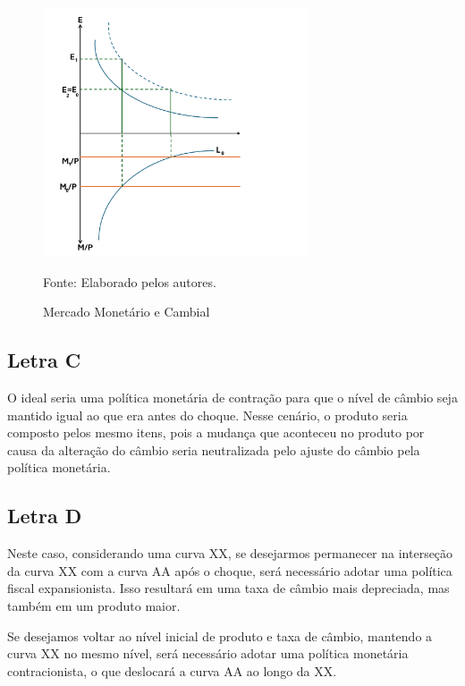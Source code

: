 \documentclass[a4paper,12pt]{article}[abntex2]
\begin{document}
\begin{figure}[H]
    \centering
    \caption{Mercado Monetário e Cambial} 
    \includegraphics[width=0.7\textwidth]{4º Período/Macroeconomia Internacional/APS 4 Macro Int/Merc. Mont L(c).png}
    \label{fig:Moeda L}
    
    \footnotesize{Fonte: Elaborado pelos autores.}
    \end{figure}

\subsection{\textbf{Letra C}}
O ideal seria uma política monetária de contração para que o nível de câmbio seja mantido igual ao que era antes do choque. Nesse cenário, o produto seria composto pelos mesmo itens, pois a mudança que aconteceu no produto por causa da alteração do câmbio seria neutralizada pelo ajuste do câmbio pela política monetária.

\subsection{\textbf{Letra D}}
Neste caso, considerando uma curva XX, se desejarmos permanecer na interseção da curva XX com a curva AA após o choque, será necessário adotar uma política fiscal expansionista. Isso resultará em uma taxa de câmbio mais depreciada, mas também em um produto maior.

Se desejamos voltar ao nível inicial de produto e taxa de câmbio, mantendo a curva XX no mesmo nível, será necessário adotar uma política monetária contracionista, o que deslocará a curva AA ao longo da XX.
\end{document}
